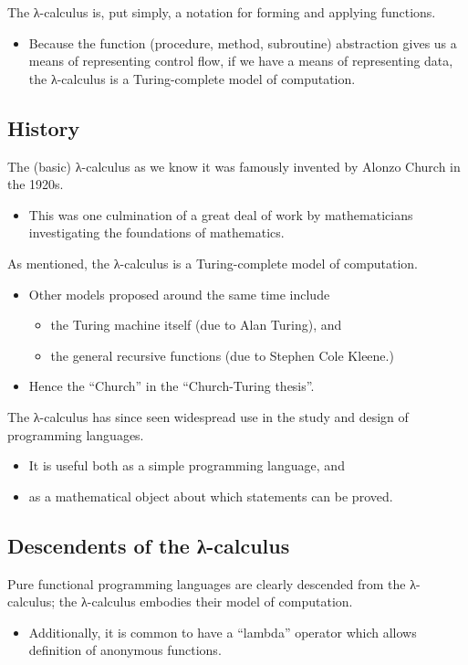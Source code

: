 \documentclass[11pt]{article}
\theoremstyle{definition}
\begin{document}
The λ-calculus is, put simply,
a notation for forming and applying functions.
\begin{itemize}
\item Because the function (procedure, method, subroutine) abstraction
gives us a means of representing control flow,
if we have a means of representing data,
the λ-calculus is a Turing-complete model of computation.
\end{itemize}

\subsection{History}
\label{sec:orge3bf2c9}

The (basic) λ-calculus as we know it was famously invented
by Alonzo Church in the 1920s.
\begin{itemize}
\item This was one culmination of a great deal of work by
mathematicians investigating the foundations of mathematics.
\end{itemize}

As mentioned, the λ-calculus is a Turing-complete model of computation.
\begin{itemize}
\item Other models proposed around the same time include
\begin{itemize}
\item the Turing machine itself (due to Alan Turing), and
\item the general recursive functions (due to Stephen Cole Kleene.)
\end{itemize}
\item Hence the “Church” in the “Church-Turing thesis”.
\end{itemize}

The λ-calculus has since seen widespread use in the study and design
of programming languages.
\begin{itemize}
\item It is useful both as a simple programming language, and
\item as a mathematical object about which statements can be proved.
\end{itemize}

\subsection{Descendents of the λ-calculus}
\label{sec:orgcda643f}

Pure functional programming languages are clearly descended
from the λ-calculus; the λ-calculus embodies their model of computation.
\begin{itemize}
\item Additionally, it is common to have a “lambda” operator
which allows definition of anonymous functions.
\end{itemize}
\end{document}
